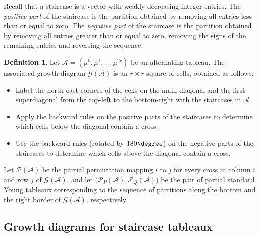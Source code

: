 \documentclass[10pt]{article}
\theoremstyle{definition}
\newtheorem{defi}[theorem]{Definition}
\newcommand{\Dfn}[1]{\emph{\color{blue}#1}}
\newcommand{\wgt}{\mu}
\newcommand{\alt}{\mathcal{A}} %
\newcommand{\Perm}{\mathcal{P}} %
\newcommand{\Grm}{\mathcal{G}} %
\begin{document}
Recall that a staircase is a vector with weakly decreasing integer
entries. The \Dfn{positive part} of the staircase is the partition
obtained by removing all entries less than or equal to zero. The
\Dfn{negative part} of the staircase is the partition obtained by
removing all entries greater than or equal to zero, removing the
signs of the remaining entries and reversing the sequence.
\begin{defi}\label{defn:P}
 Let $\alt=(\wgt^0,\wgt^1,\ldots,\wgt^{2r})$ be an alternating
 tableau. The associated growth diagram $\Grm(\alt)$ is an
 $r\times r$ square of cells, obtained as follows:
 \begin{itemize}\setlength{\itemsep}{0pt}
 \item[P1] Label the north east corners of the cells on the main diagonal and
 the first superdiagonal from the top-left to the bottom-right
 with the staircases in $\alt$.
 \item[P2] Apply the backward rules on the positive parts of the
 staircases to determine which cells below the diagonal contain a
 cross.
 \item[P3] Use the backward rules (rotated by $180\degree$) on the
 negative parts of the staircases to determine which cells above
 the diagonal contain a cross.
 \end{itemize}

 Let $\Perm(\alt)$ be the partial permutation mapping $i$ to $j$ for
 every cross in column $i$ and row $j$ of $\Grm(\alt)$, and let
 $\big(\Perm_P(\alt), \Perm_Q(\alt)\big)$ be the pair of partial
 standard Young tableaux corresponding to the sequence of partitions
 along the bottom and the right border of $\Grm(\alt)$, respectively.
\end{defi}
\setcounter{section}{6}\setcounter{subsection}{1}\setcounter{theorem}{1}\setcounter{figure}{5}
\subsection{Growth diagrams for staircase tableaux}
\end{document}
